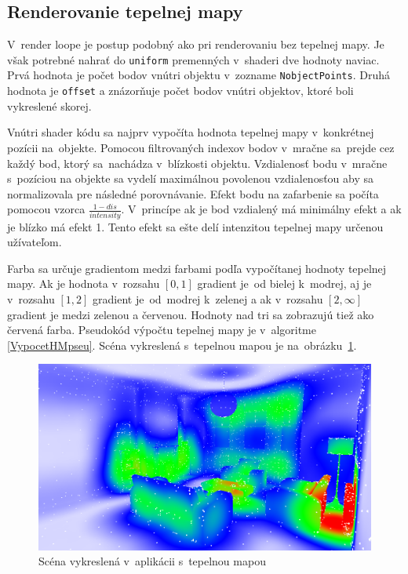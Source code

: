 \subsection*{Renderovanie tepelnej mapy}
\label{HMImpl}
V~render loope je postup podobný ako pri renderovaniu bez tepelnej mapy. Je však potrebné nahrať do \verb|uniform| premenných v~shaderi dve hodnoty naviac. Prvá hodnota je počet bodov vnútri objektu v~zozname \verb|NobjectPoints|. Druhá hodnota je \verb|offset| a znázorňuje počet bodov vnútri objektov, ktoré boli vykreslené skorej.

Vnútri shader kódu sa najprv vypočíta hodnota tepelnej mapy v~konkrétnej pozícii na~objekte. Pomocou filtrovaných indexov bodov v~mračne sa~prejde cez každý bod, ktorý sa~nachádza v~blízkosti objektu. Vzdialenosť bodu v~mračne s~pozíciou na objekte sa vydelí maximálnou povolenou vzdialenosťou aby sa normalizovala pre následné porovnávanie. Efekt bodu na zafarbenie sa počíta pomocou vzorca $\frac{1-dis}{intensity}$. V~princípe ak je bod vzdialený má minimálny efekt a ak je blízko má efekt 1. Tento efekt sa ešte delí intenzitou tepelnej mapy určenou užívateľom.

Farba sa určuje gradientom medzi farbami podľa vypočítanej hodnoty tepelnej mapy. Ak je hodnota v~rozsahu $[0,1]$ gradient je~od bielej k~modrej, aj je v~rozsahu $[1,2]$ gradient je~od~modrej k~zelenej a ak v~rozsahu $[2,\infty]$ gradient je medzi zelenou a červenou. Hodnoty nad tri sa zobrazujú tiež ako červená farba. Pseudokód výpočtu tepelnej mapy je v~algoritme \ref{VypocetHMpseu}. Scéna vykreslená s~tepelnou mapou je na~obrázku~\ref{tepelnamapaScena}.

\begin{figure}[t!]\label{tepelnamapaScena}
    \centering
    \includegraphics[width=0.90\linewidth]{obrazky-figures/tepelnamapa.png}
    \caption{Scéna vykreslená v~aplikácii s~tepelnou mapou}
\end{figure}

